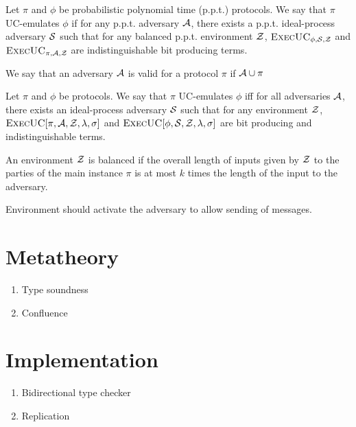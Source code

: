 \documentclass[acmsmall,review,anonymous]{acmart}\settopmatter{printfolios=true,printccs=false,printacmref=false}
\begin{document}
\begin{definition}
Let $\pi$ and $\phi$ be probabilistic polynomial time (p.p.t.) protocols. We say that
$\pi$ UC-emulates $\phi$ if for any p.p.t. adversary 
$\mathcal{A}$, there exists a p.p.t. ideal-process adversary $\mathcal{S}$
such that for any balanced p.p.t. environment $\mathcal{Z}$,
$\textsc{ExecUC}_{\phi, \mathcal{S}, \mathcal{Z}}$ and $\textsc{ExecUC}_{\pi, \mathcal{A}, \mathcal{Z}}$
are indistinguishable bit producing terms.
\end{definition}

We say that an adversary $\mathcal{A}$ is valid for a protocol $\pi$ if $\mathcal{A} \cup \pi$ 

\begin{definition}
Let $\pi$ and $\phi$ be protocols. We say that $\pi$ UC-emulates $\phi$ iff for all
adversaries $\mathcal{A}$, there exists an ideal-process adversary $\mathcal{S}$ such that
for any environment $\mathcal{Z}$,
$\textsc{ExecUC}[\pi, \mathcal{A}, \mathcal{Z}, \lambda, \sigma]$ and
$\textsc{ExecUC}[\phi, \mathcal{S}, \mathcal{Z}, \lambda, \sigma]$ are bit producing and
indistinguishable terms.
\end{definition}

\begin{definition}
An environment $\mathcal{Z}$ is balanced if the overall length of inputs given by
$\mathcal{Z}$ to the parties of the main instance $\pi$ is at most $k$ times the length
of the input to the adversary.
\end{definition}

Environment should activate the adversary to allow sending of messages.

\section{Metatheory}\label{sec:metatheory}

\begin{enumerate}
\item Type soundness
\item Confluence
\end{enumerate}

\section{Implementation}\label{sec:implementation}

\begin{enumerate}
\item Bidirectional type checker
\item Replication
\end{enumerate}
\end{document}
